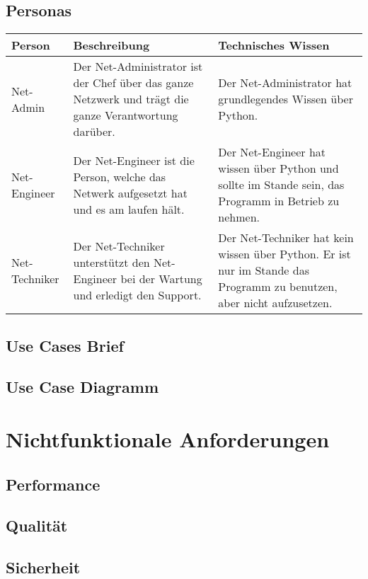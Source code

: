 \documentclass[
	ngerman,
	toc=listof, %
	toc=bibliography, %
	footnotes=multiple, %
	parskip=half, %
	numbers=noendperiod %
]{scrartcl}
\begin{document}
	\subsection{Personas}
		\begin{tabularx}{\textwidth}{lXX}
			\toprule
			Person & Beschreibung & Technisches Wissen \\
			\midrule
			Net-Admin & Der Net-Administrator ist der Chef über das ganze Netzwerk und trägt die ganze Verantwortung darüber. & Der Net-Administrator hat grundlegendes Wissen über Python.\\
			\midrule
			Net-Engineer & Der Net-Engineer ist die Person, welche das Netwerk aufgesetzt hat und es am laufen hält. & Der Net-Engineer hat wissen über Python und sollte im Stande sein, das Programm in Betrieb zu nehmen. \\
			\midrule
			Net-Techniker & Der Net-Techniker unterstützt den Net-Engineer bei der Wartung und erledigt den Support. & Der Net-Techniker hat kein wissen über Python. Er ist nur im Stande das Programm zu benutzen, aber nicht aufzusetzen. \\
			\bottomrule
		\end{tabularx}

	\subsection{Use Cases Brief}

	\subsection{Use Case Diagramm}

\section{Nichtfunktionale Anforderungen}

	\subsection{Performance}

	\subsection{Qualität}

	\subsection{Sicherheit}
\end{document}
